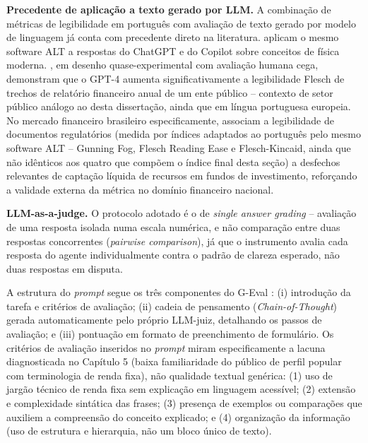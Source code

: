 \textbf{Precedente de aplica\c{c}\~ao a texto gerado por LLM.} A
combina\c{c}\~ao de m\'etricas de legibilidade em portugu\^es com
avalia\c{c}\~ao de texto gerado por modelo de linguagem j\'a conta com
precedente direto na literatura. \textcite{martins2025fisica} aplicam
o mesmo software ALT a respostas do ChatGPT e do Copilot sobre
conceitos de f\'isica moderna. \textcite{albuquerque2025}, em desenho
quase-experimental com avalia\c{c}\~ao humana cega, demonstram que o
GPT-4 aumenta significativamente a legibilidade Flesch de trechos de
relat\'orio financeiro anual de um ente p\'ublico -- contexto de setor
p\'ublico an\'alogo ao desta disserta\c{c}\~ao, ainda que em l\'ingua
portuguesa europeia. No mercado financeiro brasileiro especificamente,
\textcite{cunha2026} associam a legibilidade de documentos
regulat\'orios (medida por \'indices adaptados ao portugu\^es pelo
mesmo software ALT -- Gunning Fog, Flesch Reading Ease e
Flesch-Kincaid, ainda que n\~ao id\^enticos
aos quatro que comp\~oem o \'indice final desta se\c{c}\~ao) a
desfechos relevantes de capta\c{c}\~ao l\'iquida de recursos em fundos
de investimento, refor\c{c}ando a validade externa da m\'etrica no
dom\'inio financeiro nacional.

\textbf{LLM-as-a-judge.} O protocolo adotado \'e o de \textit{single
answer grading} \autocite{zheng2023} -- avalia\c{c}\~ao de uma resposta
isolada numa escala num\'erica, e n\~ao compara\c{c}\~ao entre duas
respostas concorrentes (\textit{pairwise comparison}), j\'a que o
instrumento avalia cada resposta do agente individualmente contra o
padr\~ao de clareza esperado, n\~ao duas respostas em disputa.

A estrutura do \textit{prompt} segue os tr\^es componentes do G-Eval
\autocite{liu2023geval}: (i) introdu\c{c}\~ao da tarefa e crit\'erios
de avalia\c{c}\~ao; (ii) cadeia de pensamento (\textit{Chain-of-Thought})
gerada automaticamente pelo pr\'oprio LLM-juiz, detalhando os passos de
avalia\c{c}\~ao; e (iii) pontua\c{c}\~ao em formato de preenchimento de
formul\'ario. Os crit\'erios de avalia\c{c}\~ao inseridos no
\textit{prompt} miram especificamente a lacuna diagnosticada no
Cap\'itulo 5 (baixa familiaridade do p\'ublico de perfil popular com
terminologia de renda fixa), n\~ao qualidade textual gen\'erica: (1)
uso de jarg\~ao t\'ecnico de renda fixa sem explica\c{c}\~ao em
linguagem acess\'ivel; (2) extens\~ao e complexidade sint\'atica das
frases; (3) presen\c{c}a de exemplos ou compara\c{c}\~oes que auxiliem
a compreens\~ao do conceito explicado; e (4) organiza\c{c}\~ao da
informa\c{c}\~ao (uso de estrutura e hierarquia, n\~ao um bloco
\'unico de texto).


